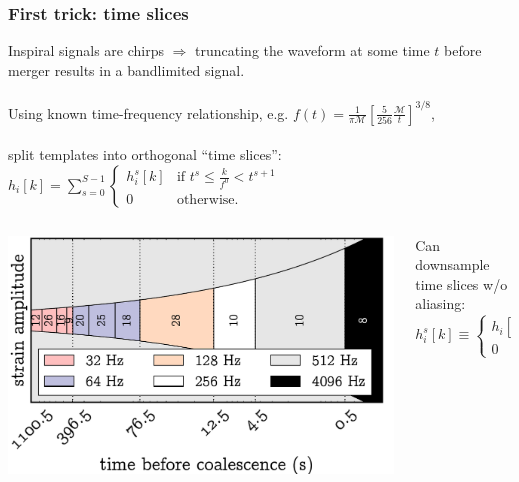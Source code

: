 \documentclass{beamer}
\begin{document}
\begin{frame}
	\frametitle{First trick: time slices}

	Inspiral signals are chirps $\Rightarrow$ truncating the waveform at some time $t$ before merger results in a bandlimited signal. \\~\\

	\footnotesize{
	Using known time-frequency relationship, e.g. $f(t) = \frac{1}{\pi \mathcal{M}} \left[ \frac{5}{256}\frac{\mathcal{M}}{t}\right]^{3/8}$, \\~\\

	split templates into orthogonal ``time slices'':
	$
	\label{eq:time-slices}
	h_{i}[k] = \sum\limits_{s=0}^{S-1}
		\begin{cases}
			h_i^s[k] & \textrm{if } t^s \leqslant \frac{k}{f^0} < t^{s+1} \\
			0 & \textrm{otherwise.}
		\end{cases}
	$}

	\begin{columns}
		\begin{column}{0.5\textwidth}
			\includegraphics[width=\textwidth]{figures/envelope}
		\end{column}
		\begin{column}{0.5\textwidth}
			\footnotesize{Can downsample time slices w/o aliasing:
			$$
			h_{i}^{s}[k] \equiv
				\begin{cases}
					h_{i}\!\left[k\frac{f}{f^s}\right] & \textrm{if } t^s \leqslant k/f^s < t^{s+1} \\
					0 & \textrm{otherwise.}
				\end{cases}
			$$
			}
		\end{column}
	\end{columns}
\end{frame}
\end{document}
